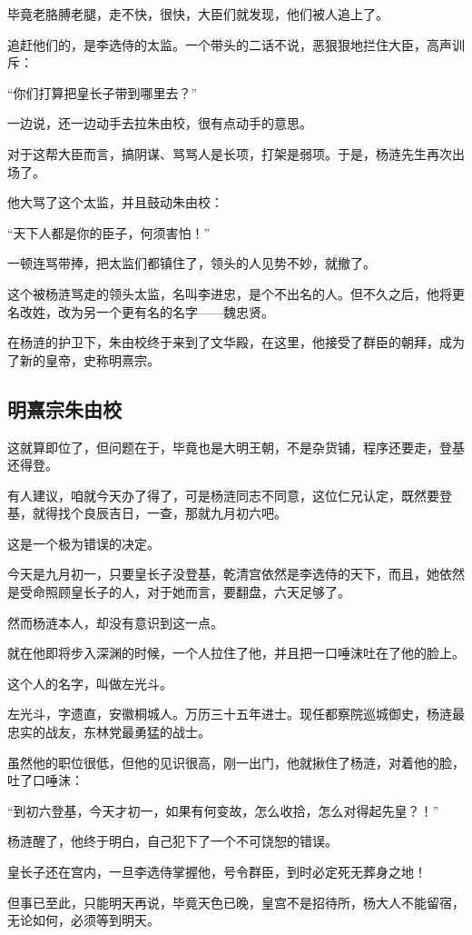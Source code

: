 \begin{multicols}{\theparacolNo}
毕竟老胳膊老腿，走不快，很快，大臣们就发现，他们被人追上了。

追赶他们的，是李选侍的太监。一个带头的二话不说，恶狠狠地拦住大臣，高声训斥：

“你们打算把皇长子带到哪里去？”

一边说，还一边动手去拉朱由校，很有点动手的意思。

对于这帮大臣而言，搞阴谋、骂骂人是长项，打架是弱项。于是，杨涟先生再次出场了。

他大骂了这个太监，并且鼓动朱由校：

“天下人都是你的臣子，何须害怕！”

一顿连骂带捧，把太监们都镇住了，领头的人见势不妙，就撤了。

这个被杨涟骂走的领头太监，名叫李进忠，是个不出名的人。但不久之后，他将更名改姓，改为另一个更有名的名字——魏忠贤。

在杨涟的护卫下，朱由校终于来到了文华殿，在这里，他接受了群臣的朝拜，成为了新的皇帝，史称明熹宗。

\subsection{明熹宗朱由校}
这就算即位了，但问题在于，毕竟也是大明王朝，不是杂货铺，程序还要走，登基还得登。

有人建议，咱就今天办了得了，可是杨涟同志不同意，这位仁兄认定，既然要登基，就得找个良辰吉日，一查，那就九月初六吧。

这是一个极为错误的决定。

今天是九月初一，只要皇长子没登基，乾清宫依然是李选侍的天下，而且，她依然是受命照顾皇长子的人，对于她而言，要翻盘，六天足够了。

然而杨涟本人，却没有意识到这一点。

就在他即将步入深渊的时候，一个人拉住了他，并且把一口唾沫吐在了他的脸上。

这个人的名字，叫做左光斗。

左光斗，字遗直，安徽桐城人。万历三十五年进士。现任都察院巡城御史，杨涟最忠实的战友，东林党最勇猛的战士。

虽然他的职位很低，但他的见识很高，刚一出门，他就揪住了杨涟，对着他的脸，吐了口唾沫：

“到初六登基，今天才初一，如果有何变故，怎么收拾，怎么对得起先皇？！”

杨涟醒了，他终于明白，自己犯下了一个不可饶恕的错误。

皇长子还在宫内，一旦李选侍掌握他，号令群臣，到时必定死无葬身之地！

但事已至此，只能明天再说，毕竟天色已晚，皇宫不是招待所，杨大人不能留宿，无论如何，必须等到明天。


\end{multicols}
